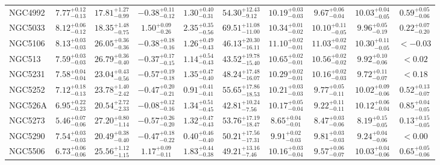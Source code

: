 \documentclass[onecolumn]{mn2e}
\begin{document}
\begin{landscape}
{\begin{center}
\begin{longtable}{lccccccccc}
NGC4992 & $7.77_{-0.13}^{+0.12}$ & $17.81_{-0.99}^{+1.27}$ & $-0.38_{-0.12}^{+0.11}$ & $1.30_{-0.31}^{+0.40}$ &$54.30_{-9.12}^{+12.43}$ & $10.19_{-0.03}^{+0.03}$ & $9.67_{-0.04}^{+0.06}$ & $10.03_{-0.05}^{+0.04}$ & $0.59_{-0.06}^{+0.05}$ \\
NGC5033 & $8.12_{-0.12}^{+0.06}$ & $18.35_{-0.75}^{+1.48}$ & $1.50_{-0.26}^{+0.09}$ & $2.35_{-0.56}^{+0.35}$ &$69.51_{-11.00}^{+11.08}$ & $10.34_{-0.02}^{+0.01}$ & $10.10_{-0.05}^{+0.11}$ & $9.96_{-0.19}^{+0.05}$ & $0.22_{-0.20}^{+0.07}$ \\
NGC5106 & $8.13_{-0.03}^{+0.03}$ & $26.05_{-0.36}^{+0.36}$ & $-0.38_{-0.16}^{+0.18}$ & $1.26_{-0.43}^{+0.49}$ &$46.13_{-16.11}^{+20.30}$ & $11.10_{-0.01}^{+0.02}$ & $11.03_{-0.02}^{+0.02}$ & $10.30_{-0.05}^{+0.11}$ & $<-0.03$ \\
NGC513 & $7.59_{-0.03}^{+0.03}$ & $26.79_{-0.40}^{+0.36}$ & $-0.37_{-0.15}^{+0.17}$ & $1.14_{-0.43}^{+0.54}$ &$43.52_{-15.40}^{+19.78}$ & $10.65_{-0.01}^{+0.02}$ & $10.56_{-0.02}^{+0.02}$ & $9.92_{-0.06}^{+0.10}$ & $<0.02$ \\
NGC5231 & $7.58_{-0.04}^{+0.04}$ & $23.04_{-0.56}^{+0.43}$ & $-0.57_{-0.18}^{+0.19}$ & $1.35_{-0.40}^{+0.47}$ &$48.24_{-16.07}^{+17.48}$ & $10.29_{-0.01}^{+0.02}$ & $10.16_{-0.03}^{+0.02}$ & $9.72_{-0.07}^{+0.11}$ & $<0.18$ \\
NGC5252 & $7.12_{-0.13}^{+0.18}$ & $23.78_{-2.42}^{+1.40}$ & $-0.47_{-0.21}^{+0.20}$ & $0.91_{-0.41}^{+0.41}$ &$55.65_{-18.53}^{+17.86}$ & $10.21_{-0.03}^{+0.03}$ & $9.77_{-0.11}^{+0.05}$ & $10.02_{-0.06}^{+0.09}$ & $0.52_{-0.07}^{+0.13}$ \\
NGC526A & $6.95_{-0.23}^{+0.22}$ & $20.54_{-2.33}^{+2.72}$ & $-0.08_{-0.16}^{+0.12}$ & $1.34_{-0.45}^{+0.51}$ &$42.81_{-7.56}^{+10.24}$ & $10.17_{-0.04}^{+0.05}$ & $9.22_{-0.11}^{+0.11}$ & $10.12_{-0.04}^{+0.06}$ & $0.85_{-0.05}^{+0.04}$ \\
NGC5273 & $5.46_{-0.06}^{+0.07}$ & $27.20_{-1.14}^{+0.80}$ & $-0.57_{-0.20}^{+0.26}$ & $1.32_{-0.43}^{+0.47}$ &$53.76_{-18.47}^{+17.19}$ & $8.65_{-0.01}^{+0.04}$ & $8.47_{-0.06}^{+0.03}$ & $8.19_{-0.05}^{+0.15}$ & $0.13_{-0.05}^{+0.15}$ \\
NGC5290 & $7.54_{-0.03}^{+0.03}$ & $20.49_{-0.40}^{+0.38}$ & $-0.47_{-0.22}^{+0.18}$ & $0.40_{-0.40}^{+0.46}$ &$50.21_{-17.31}^{+17.56}$ & $9.91_{-0.03}^{+0.02}$ & $9.81_{-0.03}^{+0.03}$ & $9.24_{-0.06}^{+0.04}$ & $<0.00$ \\
NGC5506 & $6.73_{-0.06}^{+0.06}$ & $25.56_{-1.15}^{+1.12}$ & $1.17_{-0.11}^{+0.09}$ & $1.83_{-0.38}^{+0.44}$ &$49.21_{-7.46}^{+13.16}$ & $10.16_{-0.04}^{+0.03}$ & $9.57_{-0.07}^{+0.06}$ & $10.03_{-0.06}^{+0.04}$ & $0.65_{-0.06}^{+0.05}$ \\

\end{longtable}
\end{center}}
\end{landscape}
\end{document}
